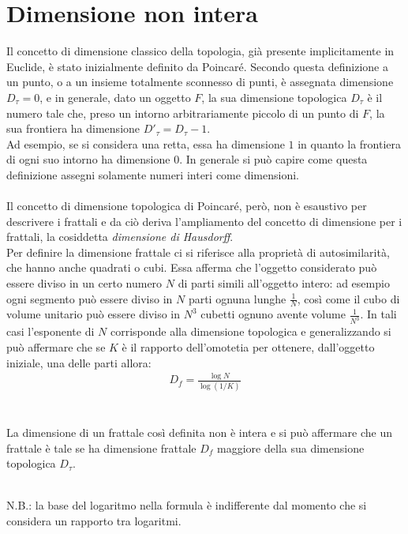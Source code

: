 \documentclass[10pt]{report}
\begin{document}
		\section{Dimensione non intera}
			Il concetto di dimensione classico della topologia, già presente implicitamente in Euclide, è stato inizialmente definito da Poincaré. Secondo questa definizione a un punto, o a un insieme totalmente sconnesso di punti, è assegnata dimensione $D_{\tau} = 0$, e in generale, dato un oggetto $F$, la sua dimensione topologica $D_{\tau}$ è il numero tale che, preso un intorno arbitrariamente piccolo di un punto di $F$, la sua frontiera ha dimensione $D'_{\tau} = D_{\tau} - 1$.\\
			Ad esempio, se si considera una retta, essa ha dimensione $1$ in quanto la frontiera di ogni suo intorno ha dimensione $0$. In generale si può capire come questa definizione assegni solamente numeri interi come dimensioni.\\\\
			Il concetto di dimensione topologica di Poincaré, però, non è esaustivo per descrivere i frattali e da ciò deriva l'ampliamento del concetto di dimensione per i frattali, la cosiddetta \textit{dimensione di Hausdorff}.\\
			Per definire la dimensione frattale ci si riferisce alla proprietà di autosimilarità, che hanno anche quadrati o cubi. Essa afferma che l'oggetto considerato può essere diviso in un certo numero $N$ di parti simili all'oggetto intero: ad esempio ogni segmento può essere diviso in $N$ parti ognuna lunghe $\frac{1}{N}$, così come il cubo di volume unitario può essere diviso in $N^3$ cubetti ognuno avente volume $\frac{1}{N^3}$. 
			In tali casi l'esponente di $N$ corrisponde alla dimensione topologica e generalizzando si può affermare che se $K$ è il rapporto dell'omotetia per ottenere, dall'oggetto iniziale, una delle parti allora:\\
			\begin{gather*}
				D_f = \frac{\log N}{\log ( 1 / K )}
			\end{gather*}
			\\\\
			La dimensione di un frattale così definita non è intera e si può affermare che un frattale è tale se ha dimensione frattale $D_f$ maggiore della sua dimensione topologica $D_{\tau}$.\\\\
			\begin{footnotesize}
				N.B.: la base del logaritmo nella formula è indifferente dal momento che si considera un rapporto tra logaritmi.
			\end{footnotesize}
		\newpage
\end{document}
